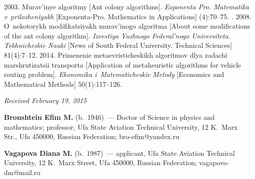 \begin{multicols}{2}
{{\begin{thebibliography}{99}
 2003. Murav'inye algoritmy [Ant colony algorithms].
\textit{Exponenta Pro. Matematika v~prilozheniyakh} [Exponenta-Pro. Mathematics
in Applications] (4):70--75.
. 2008. O~nekotorykh
modifikatsiyakh murav'inogo algoritma [About some modifications of the ant colony
algorithm]. \textit{Izvestiya Yuzhnogo Federal'nogo Universiteta. Tekhnicheskie
Nauki} [News of  South Federal University. Technical Sciences] 81(4):7--12.
 2014. Primenenie metaevristicheskikh algoritmov dlya
zadachi marshrutizatsii transporta [Application of metaheuristic algorithms for
vehicle routing problem]. \textit{Ekonomika i~Matematicheskie Metody} [Economics
and Mathematical Methods] 50(1):117--126.
\end{thebibliography}

 }
 }

\end{multicols}

\vspace*{-3pt}

\hfill{\small\textit{Received February 19, 2015}}


\Contr

\noindent
\textbf{Bronshtein Efim M.} (b.\ 1946)~---
Doctor of Science in physics and mathematics; professor, Ufa State Aviation Technical University, 12 K.~Marx Str., Ufa 450000,
Russian Federation; bro-efim@yandex.ru

\vspace*{3pt}

\noindent
\textbf{Vagapova Diana M.} (b.\ 1987)~---
applicant, Ufa State Aviation Technical University, 12 K.~Marx Street, Ufa 450000, Russian Federation; vagapova-dm@mail.ru

\label{end\stat}


\renewcommand{\bibname}{\protect\rm Литература}
